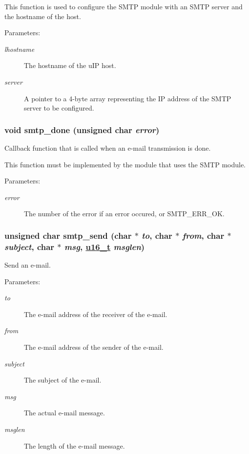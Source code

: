 This function is used to configure the SMTP module with an SMTP server and the hostname of the host.

\begin{Desc}
\item[Parameters:]
\begin{description}
\item[{\em lhostname}]The hostname of the u\-IP host.\item[{\em server}]A pointer to a 4-byte array representing the IP address of the SMTP server to be configured. \end{description}
\end{Desc}
\hypertarget{a00080_gb1fc692a2700b7a51517724364683f67}{
\subsubsection[smtp\_\-done]{\setlength{\rightskip}{0pt plus 5cm}void smtp\_\-done (unsigned char {\em error})}}
\label{a00080_gb1fc692a2700b7a51517724364683f67}


Callback function that is called when an e-mail transmission is done. 

This function must be implemented by the module that uses the SMTP module.

\begin{Desc}
\item[Parameters:]
\begin{description}
\item[{\em error}]The number of the error if an error occured, or SMTP\_\-ERR\_\-OK. \end{description}
\end{Desc}
\hypertarget{a00080_g86f84869cd17114c9837b5ca4618ee21}{
\subsubsection[smtp\_\-send]{\setlength{\rightskip}{0pt plus 5cm}unsigned char smtp\_\-send (char $\ast$ {\em to}, char $\ast$ {\em from}, char $\ast$ {\em subject}, char $\ast$ {\em msg}, \hyperlink{a00070_gfc6499c1f28697aa3bfc2804d496fd11}{u16\_\-t} {\em msglen})}}
\label{a00080_g86f84869cd17114c9837b5ca4618ee21}


Send an e-mail. 

\begin{Desc}
\item[Parameters:]
\begin{description}
\item[{\em to}]The e-mail address of the receiver of the e-mail. \item[{\em from}]The e-mail address of the sender of the e-mail. \item[{\em subject}]The subject of the e-mail. \item[{\em msg}]The actual e-mail message. \item[{\em msglen}]The length of the e-mail message. \end{description}
\end{Desc}
